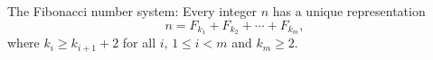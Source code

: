 The Fibonacci number system: Every integer $n$ has a unique representation
$$ n = F_{k_1} + F_{k_2} + \cdots + F_{k_m},$$
where $k_i \geq k_{i+1} + 2$ for all $i$,
$1 \leq i < m$ and $k_m \geq 2$.
